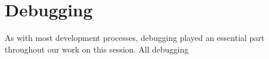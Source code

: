 \section{Debugging}

As with most development processes, debugging played an essential part throughout our work on this session. All debugging

